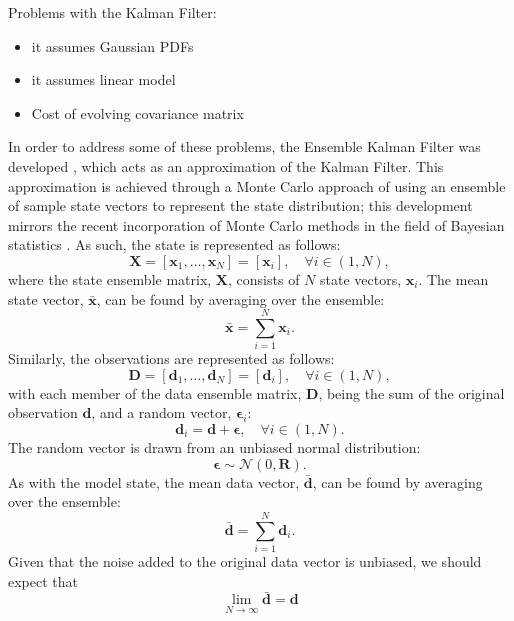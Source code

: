 Problems with the Kalman Filter:
\begin{itemize}
    \item it assumes Gaussian PDFs
    \item it assumes linear model
    \item Cost of evolving covariance matrix
\end{itemize}

In order to address some of these problems, the Ensemble Kalman Filter was
developed \citep{evensen2003ensemble, evensen2009ensemble}, which acts as an
approximation of the Kalman Filter.
This approximation is achieved through a Monte Carlo approach of using an
ensemble of sample state vectors to represent the state distribution; this
development mirrors the recent incorporation of Monte Carlo methods in the field
of Bayesian statistics \citep{wikle2007bayesian}.
As such, the state is represented as follows:
\begin{equation}
    \mathbf{X} = \left[ \mathbf{x}_1, \ldots, \mathbf{x}_N \right]
               = \left[ \mathbf{x}_i \right], \quad \forall i \in (1, N),
\end{equation}
where the state ensemble matrix, $\mathbf{X}$, consists of $N$ state vectors,
$\mathbf{x}_i$.
The mean state vector, $\bar{\mathbf{x}}$, can be found by averaging over the
ensemble:
\begin{equation}
    \bar{\mathbf{x}} = \sum_{i = 1}^{N} \mathbf{x}_i.
\end{equation}
Similarly, the observations are represented as follows:
\begin{equation}
    \mathbf{D} = \left[ \mathbf{d}_1, \ldots, \mathbf{d}_N \right]
               = \left[ \mathbf{d}_i \right], \quad \forall i \in (1, N),
\end{equation}
with each member of the data ensemble matrix, $\mathbf{D}$, being the sum of the
original observation $\mathbf{d}$, and a random vector, $\mathbf{\epsilon}_i$:
\begin{equation}
    \mathbf{d}_i = \mathbf{d} + \mathbf{\epsilon}, \quad
                   \forall i \in (1, N).
\end{equation}
The random vector is drawn from an unbiased normal distribution:
\begin{equation}
    \mathbf{\epsilon} \sim \mathcal{N} (0, \mathbf{R}).
\end{equation}
As with the model state, the mean data vector, $\bar{\mathbf{d}}$, can be found
by averaging over the ensemble:
\begin{equation}
    \bar{\mathbf{d}} = \sum_{i = 1}^{N} \mathbf{d}_i.
\end{equation}
Given that the noise added to the original data vector is unbiased, we should
expect that
\begin{equation}
    \lim_{N \to \infty} \bar{\mathbf{d}} = \mathbf{d}
\end{equation}

